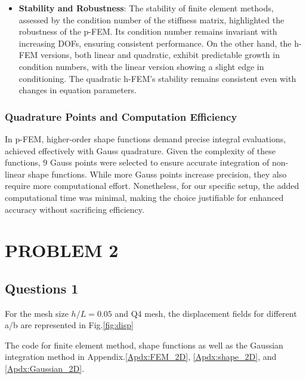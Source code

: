 \documentclass[twoside,twocolumn,10pt]{article}
\begin{document}
\begin{itemize}
    
    \item \textbf{Stability and Robustness}: The stability of finite element methods, assessed by the condition number of the stiffness matrix, highlighted the robustness of the p-FEM. Its condition number remains invariant with increasing DOFs, ensuring consistent performance. On the other hand, the h-FEM versions, both linear and quadratic, exhibit predictable growth in condition numbers, with the linear version showing a slight edge in conditioning. The quadratic h-FEM's stability remains consistent even with changes in equation parameters.
    
\end{itemize}

\subsubsection{Quadrature Points and Computation Efficiency}
In p-FEM, higher-order shape functions demand precise integral evaluations, achieved effectively with Gauss quadrature. Given the complexity of these functions, 9 Gauss points were selected to ensure accurate integration of non-linear shape functions. While more Gauss points increase precision, they also require more computational effort. Nonetheless, for our specific setup, the added computational time was minimal, making the choice justifiable for enhanced accuracy without sacrificing efficiency.

\section{\textbf{PROBLEM 2}}
\subsection{Questions 1}
For the mesh size $h/L=0.05$ and Q4 mesh, the displacement fields for different a/b are represented in Fig.\ref{fig:disp}

The code for finite element method, shape functions as well as the Gaussian integration method in Appendix.\ref{Apdx:FEM_2D}, \ref{Apdx:shape_2D}, and \ref{Apdx:Gaussian_2D}.
\end{document}
